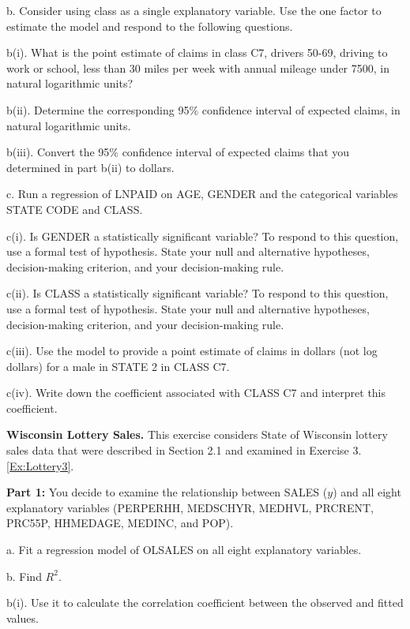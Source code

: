 \begin{exercises}
b. Consider using class as a single explanatory variable. Use the
one factor to estimate the model and respond to the following
questions.

b(i). What is the point estimate of claims in class C7, drivers
50-69, driving to work or school, less than 30 miles per week with
annual mileage under 7500, in natural logarithmic units?

b(ii). Determine the corresponding 95\% confidence interval of
expected claims, in natural logarithmic units.

b(iii). Convert the 95\% confidence interval of expected claims that
you determined in part b(ii) to dollars.

c. Run a regression of LNPAID on AGE, GENDER and the categorical
variables STATE CODE and CLASS.

c(i). Is GENDER a statistically significant variable? To respond to
this question, use a formal test of hypothesis. State your null and
alternative hypotheses, decision-making criterion, and your
decision-making rule.

c(ii). Is CLASS a statistically significant variable? To respond to
this question, use a formal test of hypothesis. State your null and
alternative hypotheses, decision-making criterion, and your
decision-making rule.

c(iii). Use the model to provide a point estimate of claims in
dollars (not log dollars) for a male in STATE 2 in CLASS C7.

c(iv). Write down the coefficient associated with CLASS C7 and
interpret this coefficient.


\item \textbf{Wisconsin Lottery Sales.}\label{Ex:Lottery4}
This exercise considers State of Wisconsin lottery sales data that
were described in Section 2.1 and examined in Exercise
3.\ref{Ex:Lottery3}.

\textbf{Part 1:} You decide to examine the relationship between
SALES ($y$) and all eight explanatory variables (PERPERHH, MEDSCHYR,
MEDHVL, PRCRENT, PRC55P, \newline HHMEDAGE, MEDINC, and POP).

a. Fit a regression model of OLSALES on all eight explanatory
variables.

b. Find $R^2$.

b(i). Use it to calculate the correlation coefficient between the
observed and fitted values.


\end{exercises}
